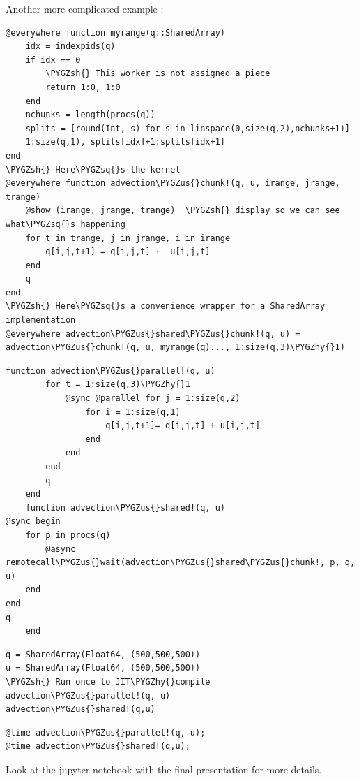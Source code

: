 \documentclass[letterpaper,10pt,english]{sphinxmanual}
\def\PYGZus{\char`\_}
\def\PYGZsh{\char`\#}
\def\PYGZhy{\char`\-}
\def\PYGZsq{\char`\'}
\renewcommand\PYGZsq{\textquotesingle}
\begin{document}
Another more complicated example :

\begin{Verbatim}[commandchars=\\\{\}]
@everywhere function myrange(q::SharedArray)
    idx = indexpids(q)
    if idx == 0
        \PYGZsh{} This worker is not assigned a piece
        return 1:0, 1:0
    end
    nchunks = length(procs(q))
    splits = [round(Int, s) for s in linspace(0,size(q,2),nchunks+1)]
    1:size(q,1), splits[idx]+1:splits[idx+1]
end
\PYGZsh{} Here\PYGZsq{}s the kernel
@everywhere function advection\PYGZus{}chunk!(q, u, irange, jrange, trange)
    @show (irange, jrange, trange)  \PYGZsh{} display so we can see what\PYGZsq{}s happening
    for t in trange, j in jrange, i in irange
        q[i,j,t+1] = q[i,j,t] +  u[i,j,t]
    end
    q
end
\PYGZsh{} Here\PYGZsq{}s a convenience wrapper for a SharedArray implementation
@everywhere advection\PYGZus{}shared\PYGZus{}chunk!(q, u) = advection\PYGZus{}chunk!(q, u, myrange(q)..., 1:size(q,3)\PYGZhy{}1)
\end{Verbatim}

\begin{Verbatim}[commandchars=\\\{\}]
    function advection\PYGZus{}parallel!(q, u)
        for t = 1:size(q,3)\PYGZhy{}1
            @sync @parallel for j = 1:size(q,2)
                for i = 1:size(q,1)
                    q[i,j,t+1]= q[i,j,t] + u[i,j,t]
                end
            end
        end
        q
    end
    function advection\PYGZus{}shared!(q, u)
@sync begin
    for p in procs(q)
        @async remotecall\PYGZus{}wait(advection\PYGZus{}shared\PYGZus{}chunk!, p, q, u)
    end
end
q
    end
\end{Verbatim}

\begin{Verbatim}[commandchars=\\\{\}]
q = SharedArray(Float64, (500,500,500))
u = SharedArray(Float64, (500,500,500))
\PYGZsh{} Run once to JIT\PYGZhy{}compile
advection\PYGZus{}parallel!(q, u)
advection\PYGZus{}shared!(q,u)
\end{Verbatim}

\begin{Verbatim}[commandchars=\\\{\}]
@time advection\PYGZus{}parallel!(q, u);
@time advection\PYGZus{}shared!(q,u);
\end{Verbatim}

Look at the jupyter notebook with the final presentation for more details.
\end{document}
